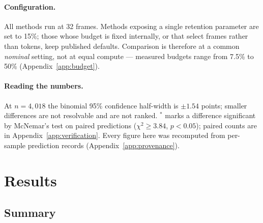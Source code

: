 \documentclass[11pt]{article}
\begin{document}
\paragraph{Configuration.} All methods run at 32 frames. Methods exposing a
single retention parameter are set to 15\%; those whose budget is fixed
internally, or that select frames rather than tokens, keep published
defaults. Comparison is therefore at a common \emph{nominal} setting, not at
equal compute --- measured budgets range from 7.5\% to 50\%
(Appendix~\ref{app:budget}).

\paragraph{Reading the numbers.} At $n=4{,}018$ the binomial 95\%
confidence half-width is $\pm1.54$ points; smaller differences are not
resolvable and are not ranked. $^{*}$ marks a difference significant by
McNemar's test on paired predictions ($\chi^2\geq3.84$, $p<0.05$); paired
counts are in Appendix~\ref{app:verification}. Every figure here was
recomputed from per-sample prediction records
(Appendix~\ref{app:provenance}).

\section{Results}
\label{sec:results}

\subsection{Summary}
\label{sec:summary}
\end{document}
